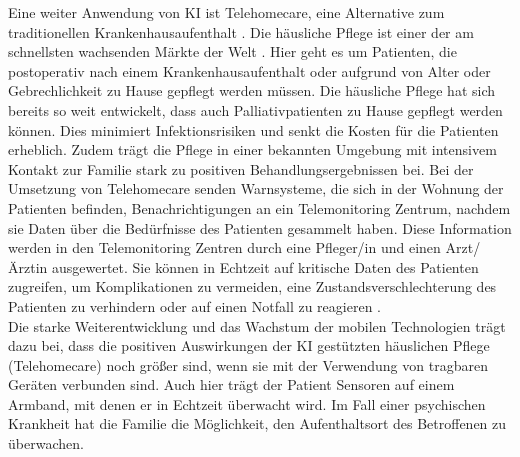Eine weiter Anwendung von KI ist Telehomecare, eine Alternative zum traditionellen Krankenhausaufenthalt \cite{Chapter_14}. Die häusliche Pflege ist einer der am schnellsten wachsenden Märkte der Welt \cite{Chapter_14}. Hier geht es um Patienten, die postoperativ nach einem Krankenhausaufenthalt oder aufgrund von Alter oder Gebrechlichkeit zu Hause gepflegt werden müssen. Die häusliche Pflege hat sich bereits so weit entwickelt, dass auch Palliativpatienten zu Hause gepflegt werden können. Dies minimiert Infektionsrisiken und senkt die Kosten für die Patienten erheblich. Zudem trägt die Pflege in einer bekannten Umgebung mit intensivem Kontakt zur Familie stark zu positiven Behandlungsergebnissen bei.
Bei der Umsetzung von Telehomecare senden Warnsysteme, die sich in der Wohnung der Patienten befinden, Benachrichtigungen an ein Telemonitoring Zentrum, nachdem sie Daten über die Bedürfnisse des Patienten gesammelt haben.\cite{Chapter_14} Diese Information werden in den Telemonitoring Zentren durch eine Pfleger/in und einen Arzt/Ärztin ausgewertet. Sie können in Echtzeit auf kritische Daten des Patienten zugreifen, um Komplikationen zu vermeiden, eine Zustandsverschlechterung des Patienten zu verhindern oder auf einen Notfall zu reagieren \cite{Chapter_14}.\\
Die starke Weiterentwicklung und das Wachstum der mobilen Technologien trägt dazu bei, dass die positiven Auswirkungen der KI gestützten häuslichen Pflege (Telehomecare) noch größer sind, wenn sie mit der Verwendung von tragbaren Geräten verbunden sind. Auch hier trägt der Patient Sensoren auf einem Armband, mit denen er in Echtzeit überwacht wird. Im Fall einer psychischen Krankheit hat die Familie die Möglichkeit, den Aufenthaltsort des Betroffenen zu überwachen.\cite{Chapter_14}\\ 